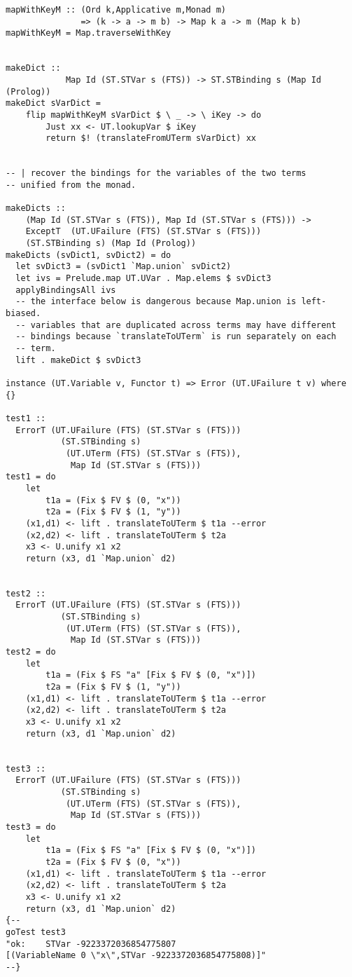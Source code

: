 \documentclass[thesis-solanki.tex]{files}
\begin{document}
\begin{verbatim}
mapWithKeyM :: (Ord k,Applicative m,Monad m)
               => (k -> a -> m b) -> Map k a -> m (Map k b)
mapWithKeyM = Map.traverseWithKey


makeDict :: 
            Map Id (ST.STVar s (FTS)) -> ST.STBinding s (Map Id (Prolog))
makeDict sVarDict =
    flip mapWithKeyM sVarDict $ \ _ -> \ iKey -> do
        Just xx <- UT.lookupVar $ iKey
        return $! (translateFromUTerm sVarDict) xx


-- | recover the bindings for the variables of the two terms
-- unified from the monad.

makeDicts :: 
    (Map Id (ST.STVar s (FTS)), Map Id (ST.STVar s (FTS))) ->
    ExceptT  (UT.UFailure (FTS) (ST.STVar s (FTS)))
    (ST.STBinding s) (Map Id (Prolog))
makeDicts (svDict1, svDict2) = do
  let svDict3 = (svDict1 `Map.union` svDict2)
  let ivs = Prelude.map UT.UVar . Map.elems $ svDict3
  applyBindingsAll ivs
  -- the interface below is dangerous because Map.union is left-biased.
  -- variables that are duplicated across terms may have different
  -- bindings because `translateToUTerm` is run separately on each
  -- term.
  lift . makeDict $ svDict3

instance (UT.Variable v, Functor t) => Error (UT.UFailure t v) where {}

test1 ::
  ErrorT (UT.UFailure (FTS) (ST.STVar s (FTS)))
           (ST.STBinding s)
            (UT.UTerm (FTS) (ST.STVar s (FTS)),
             Map Id (ST.STVar s (FTS)))
test1 = do
    let
        t1a = (Fix $ FV $ (0, "x"))
        t2a = (Fix $ FV $ (1, "y"))
    (x1,d1) <- lift . translateToUTerm $ t1a --error
    (x2,d2) <- lift . translateToUTerm $ t2a
    x3 <- U.unify x1 x2
    return (x3, d1 `Map.union` d2)


test2 ::
  ErrorT (UT.UFailure (FTS) (ST.STVar s (FTS)))
           (ST.STBinding s)
            (UT.UTerm (FTS) (ST.STVar s (FTS)),
             Map Id (ST.STVar s (FTS)))
test2 = do
    let
        t1a = (Fix $ FS "a" [Fix $ FV $ (0, "x")])
        t2a = (Fix $ FV $ (1, "y"))
    (x1,d1) <- lift . translateToUTerm $ t1a --error
    (x2,d2) <- lift . translateToUTerm $ t2a
    x3 <- U.unify x1 x2
    return (x3, d1 `Map.union` d2)


test3 ::
  ErrorT (UT.UFailure (FTS) (ST.STVar s (FTS)))
           (ST.STBinding s)
            (UT.UTerm (FTS) (ST.STVar s (FTS)),
             Map Id (ST.STVar s (FTS)))
test3 = do
    let
        t1a = (Fix $ FS "a" [Fix $ FV $ (0, "x")])
        t2a = (Fix $ FV $ (0, "x"))
    (x1,d1) <- lift . translateToUTerm $ t1a --error
    (x2,d2) <- lift . translateToUTerm $ t2a
    x3 <- U.unify x1 x2
    return (x3, d1 `Map.union` d2)
{--
goTest test3
"ok:    STVar -9223372036854775807 
[(VariableName 0 \"x\",STVar -9223372036854775808)]"
--}


\end{verbatim}
\end{document}
